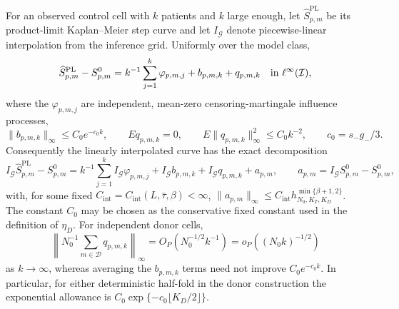 For an observed control cell with \(k\) patients and \(k\) large enough, let \(\widehat S^{\mathrm{PL}}_{p,m}\) be its product-limit Kaplan--Meier step curve and let \(I_{\mathcal G}\) denote piecewise-linear interpolation from the inference grid.  Uniformly over the model class,
\[
 \widehat S^{\mathrm{PL}}_{p,m}-S^0_{p,m}
 =k^{-1}\sum_{j=1}^{k}\varphi_{p,m,j}+b_{p,m,k}+q_{p,m,k}
 \quad\hbox{in }\ell^\infty(\mathcal I),
\]
where the \(\varphi_{p,m,j}\) are independent, mean-zero censoring-martingale influence processes,
\[
 \|b_{p,m,k}\|_\infty\le C_0e^{-c_0k},\qquad
 E q_{p,m,k}=0,\qquad
 E\|q_{p,m,k}\|_\infty^2\le C_0k^{-2},
 \qquad c_0=s_-g_-/3.
\]
Consequently the linearly interpolated curve has the exact decomposition
\[
 I_{\mathcal G}\widehat S^{\mathrm{PL}}_{p,m}-S^0_{p,m}
 =k^{-1}\sum_{j=1}^{k}I_{\mathcal G}\varphi_{p,m,j}
  +I_{\mathcal G}b_{p,m,k}+I_{\mathcal G}q_{p,m,k}+a_{p,m},
 \qquad
 a_{p,m}=I_{\mathcal G}S^0_{p,m}-S^0_{p,m},
\]
with, for some fixed \(C_{\mathrm{int}}=C_{\mathrm{int}}(L,\bar\tau,\beta)<\infty\), \(\|a_{p,m}\|_\infty\le C_{\mathrm{int}}h_{N_0,K_T,K_D}^{\min\{\beta+1,2\}}\).  The constant \(C_0\) may be chosen as the conservative fixed constant used in the definition of \(\eta_D\).  For independent donor cells,
\[
 \left\|N_0^{-1}\sum_{m\in\mathcal D}q_{p,m,k}\right\|_\infty
 =O_P(N_0^{-1/2}k^{-1})
 =o_P((N_0k)^{-1/2})
\]
as \(k\to\infty\), whereas averaging the \(b_{p,m,k}\) terms need not improve \(C_0e^{-c_0k}\).  In particular, for either deterministic half-fold in the donor construction the exponential allowance is \(C_0\exp\{-c_0\lfloor K_D/2\rfloor\}\).